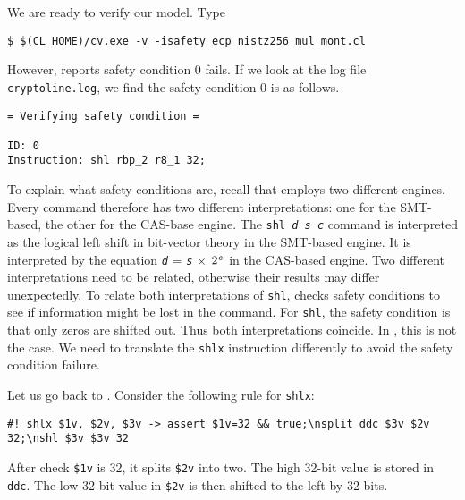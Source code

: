 \documentclass{amsproc}
\begin{document}
We are ready to verify our model. Type
\begin{verbatim}
$ $(CL_HOME)/cv.exe -v -isafety ecp_nistz256_mul_mont.cl
\end{verbatim}

However, \cryptoline reports safety condition 0 fails. If we look at
the log file \texttt{cryptoline.log}, we find the safety condition 0
is as follows.
\begin{verbatim}
= Verifying safety condition =

ID: 0
Instruction: shl rbp_2 r8_1 32;
\end{verbatim}
To explain what safety conditions are, recall that \cryptoline employs
two different engines. Every \cryptoline command therefore has two
different interpretations: one for the SMT-based, the other for the
CAS-base engine. The \texttt{shl \textit{d} \textit{s} \textit{c}}
command is interpreted as the logical left shift in bit-vector theory
in the SMT-based engine. It is interpreted by the equation 
\texttt{\textit{d}} = \texttt{\textit{s}} $\times$
$2^{\texttt{\textit{c}}}$ in the CAS-based engine. Two different
interpretations need to be related, otherwise their results may differ
unexpectedly. To relate both interpretations of \texttt{shl},
\cryptoline checks safety conditions to see if information
might be lost in the command. For \texttt{shl}, the safety condition
is that only zeros are shifted out. Thus both interpretations
coincide. In \nistzmul, this is not the case. We need to translate the
\xeightysix \texttt{shlx} instruction differently to avoid the safety
condition failure.

Let us go back to \nistzmulgas. Consider the following rule for
\texttt{shlx}:
\begin{verbatim}
#! shlx $1v, $2v, $3v -> assert $1v=32 && true;\nsplit ddc $3v $2v 32;\nshl $3v $3v 32
\end{verbatim}
After check \texttt{\$1v} is 32, it splits \texttt{\$2v} into two. The
high 32-bit value is stored in \texttt{ddc}. The low 32-bit value in
\texttt{\$2v} is then shifted to the left by 32 bits. 
\end{document}
